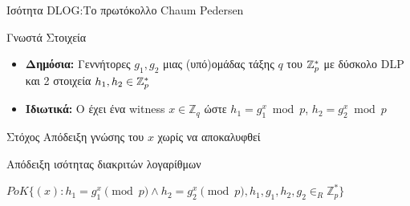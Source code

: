 \documentclass[handout]{beamer}
\begin{document}
\begin{frame}[allowframebreaks]{Ισότητα DLOG:Το πρωτόκολλο Chaum Pedersen}
\begin{block}{Γνωστά Στοιχεία}
\begin{itemize}
\item \textbf{Δημόσια:} Γεννήτορες $g_1, g_2$ μιας (υπό)ομάδας τάξης $q$ του $\mathbb{Z}^*_{p}$ με δύσκολο DLP και 2 στοιχεία $h_1, h_2 \in \mathbb{Z}^*_{p}$ 
\item \textbf{Ιδιωτικά:} O \prv έχει ένα witness $x \in \mathbb{Z}_q$  ώστε $h_1 = g_{1}^{x} \bmod{p}$, $h_2 = g_{2}^{x} \bmod{p}$
\end{itemize}
\end{block}

\begin{block}{Στόχος}
Απόδειξη γνώσης του $x$ χωρίς να αποκαλυφθεί

Απόδειξη ισότητας διακριτών λογαρίθμων
\end{block}

\begin{small}
$PoK \{(x): h_1 = g_1^x \pmod{p} \wedge h_2 = g_2^x \pmod{p},  h_1,g_1,h_2,g_2 \in_R \mathbb{Z}_p^* \}$
\end{small}

\begin{columns}


\end{columns}
\end{frame}
\end{document}
